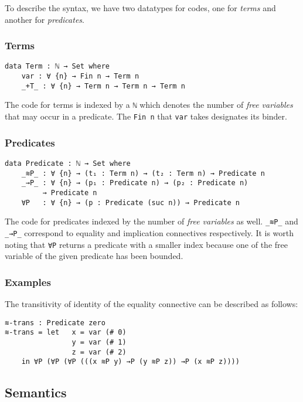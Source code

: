 \documentclass[\main/thesis.tex]{subfiles}
\begin{document}
To describe the syntax, we have two datatypes for codes,
one for \textit{terms} and another for \textit{predicates}.

\subsubsection{Terms}

\begin{lstlisting}
data Term : ℕ → Set where
    var : ∀ {n} → Fin n → Term n
    _+T_ : ∀ {n} → Term n → Term n → Term n
\end{lstlisting}

The code for terms is indexed by a \lstinline|ℕ| which denotes the number
of \textit{free variables} that may occur in a predicate.
The \lstinline|Fin n| that \lstinline|var| takes designates its binder.
\subsubsection{Predicates}

\begin{lstlisting}
data Predicate : ℕ → Set where
    _≋P_ : ∀ {n} → (t₁ : Term n) → (t₂ : Term n) → Predicate n
    _→P_ : ∀ {n} → (p₁ : Predicate n) → (p₂ : Predicate n)
         → Predicate n
    ∀P   : ∀ {n} → (p : Predicate (suc n)) → Predicate n
\end{lstlisting}

The code for predicates indexed by the number of \textit{free variables} as well.
\lstinline|_≋P_| and \lstinline|_→P_| correspond to equality and implication
connectives respectively.
It is worth noting that \lstinline|∀P| returns a predicate with a smaller index
because one of the free variable of the given predicate has been bounded.

\subsubsection{Examples}

The transitivity of identity of the equality connective can be described
as follows:

\begin{lstlisting}
≋-trans : Predicate zero
≋-trans = let   x = var (# 0)
                y = var (# 1)
                z = var (# 2)
    in ∀P (∀P (∀P (((x ≋P y) →P (y ≋P z)) →P (x ≋P z))))
\end{lstlisting}

\subsection{Semantics}
\end{document}
